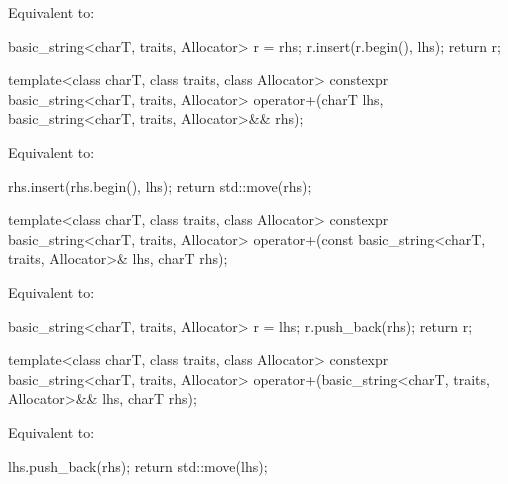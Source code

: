 \begin{itemdescr}
\pnum
\effects
Equivalent to:
\begin{codeblock}
basic_string<charT, traits, Allocator> r = rhs;
r.insert(r.begin(), lhs);
return r;
\end{codeblock}
\end{itemdescr}

%
\begin{itemdecl}
template<class charT, class traits, class Allocator>
  constexpr basic_string<charT, traits, Allocator>
    operator+(charT lhs, basic_string<charT, traits, Allocator>&& rhs);
\end{itemdecl}

\begin{itemdescr}
\pnum
\effects
Equivalent to:
\begin{codeblock}
rhs.insert(rhs.begin(), lhs);
return std::move(rhs);
\end{codeblock}
\end{itemdescr}

%
\begin{itemdecl}
template<class charT, class traits, class Allocator>
  constexpr basic_string<charT, traits, Allocator>
    operator+(const basic_string<charT, traits, Allocator>& lhs, charT rhs);
\end{itemdecl}

\begin{itemdescr}
\pnum
\effects
Equivalent to:
\begin{codeblock}
basic_string<charT, traits, Allocator> r = lhs;
r.push_back(rhs);
return r;
\end{codeblock}
\end{itemdescr}

%
\begin{itemdecl}
template<class charT, class traits, class Allocator>
  constexpr basic_string<charT, traits, Allocator>
    operator+(basic_string<charT, traits, Allocator>&& lhs, charT rhs);
\end{itemdecl}

\begin{itemdescr}
\pnum
\effects
Equivalent to:
\begin{codeblock}
lhs.push_back(rhs);
return std::move(lhs);
\end{codeblock}
\end{itemdescr}

